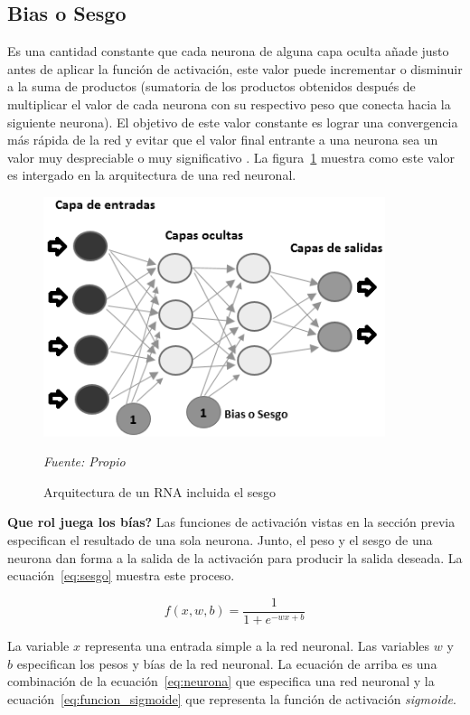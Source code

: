 \subsection{Bias o Sesgo}
Es una cantidad constante que cada neurona de alguna capa oculta añade justo antes de aplicar la función de activación, este valor puede incrementar o disminuir a la suma de productos (sumatoria de los productos obtenidos después de multiplicar el valor de cada neurona con su respectivo peso que conecta hacia la siguiente neurona). El objetivo de este valor constante es lograr una convergencia más rápida de la red y evitar que el valor final entrante a una neurona sea un valor muy despreciable o muy significativo \cite{goodfellow2016deep}. La figura~\ref{fig:arquitectura_red_neuronal} muestra como este valor es intergado en la arquitectura de una red neuronal.

\begin{figure}[H]
		\centering
		\includegraphics[width=100mm]{Imagenes/arquitectura_red_neuronal.png}
		\caption{Arquitectura de un RNA incluida el sesgo}
		\vspace{0.15cm}
		\textit{Fuente: Propio}
		\label{fig:arquitectura_red_neuronal}
\end{figure}


\textbf{Que rol juega los bías?} Las funciones de activación vistas en la sección previa especifican el resultado de una sola neurona. Junto, el peso y el sesgo de una neurona dan forma a la salida de la activación para producir la salida deseada. La ecuación~\ref{eq:sesgo} muestra este proceso.

\begin{equation}\label{eq:sesgo}
f(x, w, b) = \frac{1}{1 + e^{-wx+b}}
\end{equation}

La variable $x$ representa una entrada simple a la red neuronal. Las variables $w$ y $b$ especifican los pesos y bías de la red neuronal. La ecuación de arriba es una combinación de la ecuación~\ref{eq:neurona} que especifica una red neuronal y la ecuación~\ref{eq:funcion_sigmoide} que representa la función de activación \textit{sigmoide}.

